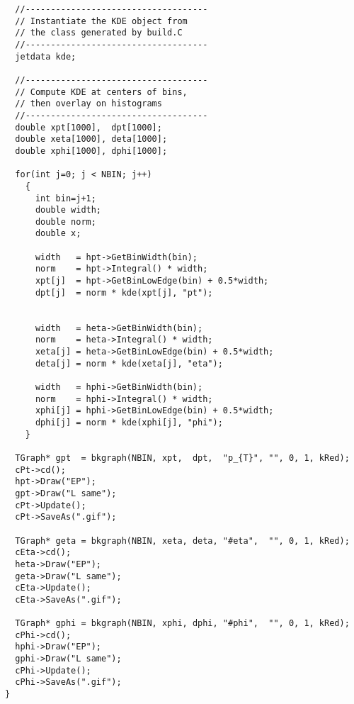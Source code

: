 \begin{verbatim}
  //------------------------------------
  // Instantiate the KDE object from
  // the class generated by build.C
  //------------------------------------
  jetdata kde;

  //------------------------------------
  // Compute KDE at centers of bins, 
  // then overlay on histograms
  //------------------------------------
  double xpt[1000],  dpt[1000];
  double xeta[1000], deta[1000];
  double xphi[1000], dphi[1000];

  for(int j=0; j < NBIN; j++)
    {
      int bin=j+1;
      double width;
      double norm;
      double x;

      width   = hpt->GetBinWidth(bin);
      norm    = hpt->Integral() * width;
      xpt[j]  = hpt->GetBinLowEdge(bin) + 0.5*width;
      dpt[j]  = norm * kde(xpt[j], "pt");


      width   = heta->GetBinWidth(bin);
      norm    = heta->Integral() * width;
      xeta[j] = heta->GetBinLowEdge(bin) + 0.5*width;
      deta[j] = norm * kde(xeta[j], "eta");

      width   = hphi->GetBinWidth(bin);
      norm    = hphi->Integral() * width;
      xphi[j] = hphi->GetBinLowEdge(bin) + 0.5*width;
      dphi[j] = norm * kde(xphi[j], "phi");
    }

  TGraph* gpt  = bkgraph(NBIN, xpt,  dpt,  "p_{T}", "", 0, 1, kRed);
  cPt->cd();
  hpt->Draw("EP");
  gpt->Draw("L same");
  cPt->Update();
  cPt->SaveAs(".gif");

  TGraph* geta = bkgraph(NBIN, xeta, deta, "#eta",  "", 0, 1, kRed);
  cEta->cd();
  heta->Draw("EP");
  geta->Draw("L same");
  cEta->Update();
  cEta->SaveAs(".gif");

  TGraph* gphi = bkgraph(NBIN, xphi, dphi, "#phi",  "", 0, 1, kRed);
  cPhi->cd();
  hphi->Draw("EP");
  gphi->Draw("L same");
  cPhi->Update();
  cPhi->SaveAs(".gif");
}
\end{verbatim}
\normalsize
 